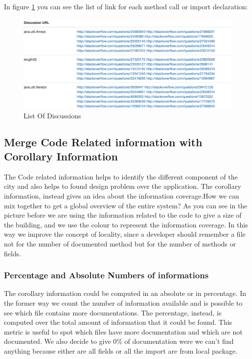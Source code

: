 \documentclass[]{usiinfbachelorproject}
\begin{document}
In figure \ref{fig:list} you can see the list of link for each method call or import declaration:


 \begin{figure}[H]
	\centering
	\includegraphics[width=1\textwidth]{images/listOfDiscussions}
		\caption[List Of Discussions]{List Of Discussions \label{fig:list}
}

\end{figure}


\subsection{Merge Code Related information with Corollary Information}
The Code related information helps to identify the different component of the city and also helps to found design problem over the application. The corollary information, instead gives an idea about the information coverage.How we can mix together to get a global overview of the entire system? As you can see in the picture before we are using the information related to the code to give a size of the building, and we use  the colour to represent the information coverage. In this way we improve the concept of locality, since a developer should remember a file not for the number of documented method but for the number of methods or fields.  

\subsubsection{Percentage and Absolute Numbers of informations}
The corollary information could be computed in an absolute or in percentage. In the former way we count the number of information available and is possible to see which file contains more documentations. The percentage, instead, is computed over the total amount of information that it could be found. This metric is useful to spot which files have more documentation and which are not documented. We also decide to give 0\% of documentation were we can't find anything because either are all fields or all the import are from local package.
\end{document}
